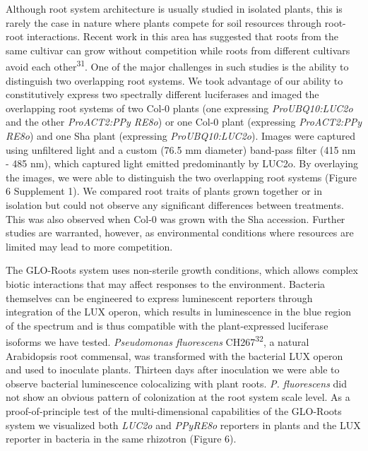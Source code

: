 \documentclass[]{article}
\begin{document}
Although root system architecture is usually studied in isolated plants,
this is rarely the case in nature where plants compete for soil
resources through root-root interactions. Recent work in this area has
suggested that roots from the same cultivar can grow without competition
while roots from different cultivars avoid each
other\textsuperscript{31}. One of the major challenges in such studies
is the ability to distinguish two overlapping root systems. We took
advantage of our ability to constitutively express two spectrally
different luciferases and imaged the overlapping root systems of two
Col-0 plants (one expressing \emph{ProUBQ10:LUC2o} and the other
\emph{ProACT2:PPy RE8o}) or one Col-0 plant (expressing
\emph{ProACT2:PPy RE8o}) and one Sha plant (expressing
\emph{ProUBQ10:LUC2o}). Images were captured using unfiltered light and
a custom (76.5 mm diameter) band-pass filter (415 nm - 485 nm), which
captured light emitted predominantly by LUC2o. By overlaying the images,
we were able to distinguish the two overlapping root systems (Figure 6
Supplement 1). We compared root traits of plants grown together or in
isolation but could not observe any significant differences between
treatments. This was also observed when Col-0 was grown with the Sha
accession. Further studies are warranted, however, as environmental
conditions where resources are limited may lead to more competition.

The GLO-Roots system uses non-sterile growth conditions, which allows
complex biotic interactions that may affect responses to the
environment. Bacteria themselves can be engineered to express
luminescent reporters through integration of the LUX operon, which
results in luminescence in the blue region of the spectrum and is thus
compatible with the plant-expressed luciferase isoforms we have tested.
\emph{Pseudomonas fluorescens} CH267\textsuperscript{32}, a natural
Arabidopsis root commensal, was transformed with the bacterial LUX
operon and used to inoculate plants. Thirteen days after inoculation we
were able to observe bacterial luminescence colocalizing with plant
roots. \emph{P. fluorescens} did not show an obvious pattern of
colonization at the root system scale level. As a proof-of-principle
test of the multi-dimensional capabilities of the GLO-Roots system we
visualized both \emph{LUC2o} and \emph{PPyRE8o} reporters in plants and
the LUX reporter in bacteria in the same rhizotron (Figure 6).
\end{document}
